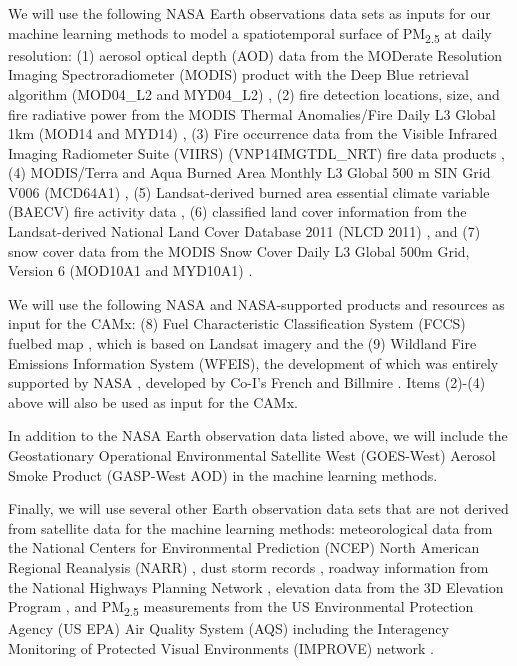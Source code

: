 \documentclass[authoryear]{elsarticle}
\begin{document}
We will use the following NASA Earth observations data sets as inputs for our machine learning methods to model a spatiotemporal surface of PM\textsubscript{2.5} at daily resolution: 
(1) aerosol optical depth (AOD) data from the MODerate Resolution Imaging Spectroradiometer (MODIS) product with the Deep Blue retrieval algorithm (MOD04\_L2 and MYD04\_L2) \citep{Sayer2013}, 
(2) fire detection locations, size, and fire radiative power from the MODIS Thermal Anomalies/Fire Daily L3 Global 1km (MOD14 and MYD14) \citep{Giglio2006}, 
(3) Fire occurrence data from the Visible Infrared Imaging Radiometer Suite (VIIRS) (VNP14IMGTDL\_NRT) fire data products \citep{Schroeder2014}, 
(4) MODIS/Terra and Aqua Burned Area Monthly L3 Global 500 m SIN Grid V006 (MCD64A1) \citep{MODISBurnArea}, 
(5) Landsat-derived burned area essential climate variable (BAECV) fire activity data \citep{Hawbaker2017}, 
(6) classified land cover information from the Landsat-derived National Land Cover Database 2011 (NLCD 2011) \citep{Homer2017}, and 
(7) snow cover data from the MODIS Snow Cover Daily L3 Global 500m Grid, Version 6 (MOD10A1 and MYD10A1) \citep{Hall2016}.

We will use the following NASA and NASA-supported products and resources as input for the CAMx: 
(8) Fuel Characteristic Classification System (FCCS) fuelbed map \citep{McKenzie2012}, which is based on Landsat imagery and the 
(9) Wildland Fire Emissions Information System (WFEIS), the development of which was entirely supported by NASA  \citep{WFEIS2017}, developed by Co-I's French and Billmire \citep{French2014}. Items (2)-(4) above will also be used as input for the CAMx.

In addition to the NASA Earth observation data listed above, we will include the Geostationary Operational Environmental Satellite West (GOES-West) Aerosol Smoke Product (GASP-West AOD) \citep{GASPAerosolProduct2017} in the machine learning methods. 

Finally, we will use several other Earth observation data sets that are not derived from satellite data for the machine learning methods: 
meteorological data from the National Centers for Environmental Prediction (NCEP) North American Regional Reanalysis (NARR) \citep{Mesinger2006,NCEPReanalysis2005}, dust storm records \citep{NWSstorms2017}, roadway information from the National Highways Planning Network \citep{NHP2017}, elevation data from the 3D Elevation Program \citep{USGSElevation2017}, and PM\textsubscript{2.5} measurements from the US Environmental Protection Agency (US EPA) Air Quality System (AQS) \citep{EPAAirData2017} including the Interagency Monitoring of Protected Visual Environments (IMPROVE) network \citep{EPANPM25IMPROVE2017}.
\end{document}
